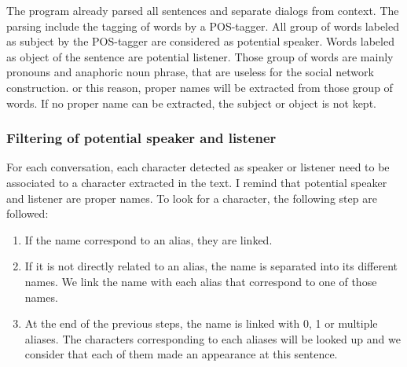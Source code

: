 \documentclass[a4paper, 12pt]{report}
\begin{document}
The program already parsed all sentences and separate dialogs from context. The parsing include the tagging of words by a POS-tagger. 
All group of words labeled as subject by the POS-tagger are considered as potential speaker. Words labeled as object of the sentence are potential listener. 
Those group of words are mainly pronouns and anaphoric noun phrase, that are useless for the social network construction. 
or this reason, proper names will be extracted from those group of words. If no proper name can be extracted, the subject or object is not kept. 

\subsubsection{Filtering of potential speaker and listener}
\label{filtering}
For each conversation, each character detected as speaker or listener need to be associated to a character extracted in the text. 
I remind that potential speaker and listener are proper names. To look for a character, the following step are followed:\\
\begin{enumerate}
\item If the name correspond to an alias, they are linked.
\item If it is not directly related to an alias, the name is separated into its different names. We link the name with each alias that correspond to one of those names.
\item At the end of the previous steps, the name is linked with 0, 1 or multiple aliases. The characters corresponding to each aliases will be looked up
 and we consider that each of them made an appearance at this sentence.
\end{enumerate}
\end{document}
